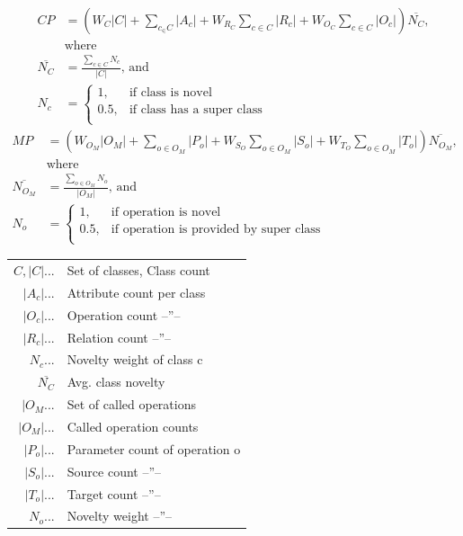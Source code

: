 \documentclass[conference]{IEEEtran}
\begin{document}
\small
\begin{align}
CP &= \left(W_C |C| + \sum_{c_ \in C} |A_c| + W_{R_C} \sum_{c \in C} |R_c| + W_{O_C} \sum_{c \in C} |O_c| \right) \overline{N_C},\\ &\text{where}\\
\overline{N_C} &= \frac{\sum_{c \in C} N_c}{|C|},\, \text{and}\\
N_c &=
\begin{cases}
1,& \text{if class is novel}\\
0.5,& \text{if class has a super class}\\
\end{cases}
\end{align}
\begin{align}
MP &= \left(W_{O_M} |O_M| + \sum_{o \in O_M} |P_o| + W_{S_O} \sum_{o \in O_M} |S_o| + W_{T_O} \sum_{o \in O_M} |T_o| \right) \overline{N_{O_M}},\\ &\text{where}\\
\overline{N_{O_M}} &= \frac{\sum_{o \in O_M} N_o}{|O_M|},\,\text{and}\\
N_o &=
\begin{cases}
1,& \text{if operation is novel}\\
0.5,& \text{if operation is provided by super class}\\
\end{cases}
\end{align}

\begin{tabularx}{\linewidth}{rX}
\hline
$C, |C|...$ & Set of classes, Class count \\
$|A_c|...$  & Attribute count per class   \\
$|O_c|...$  & Operation count --''--      \\
$|R_c|...$  & Relation count --''--       \\
$N_c...$    & Novelty weight of class c \\
$\overline{N_C}$ & Avg. class novelty \\
$|O_M...$  & Set of called operations \\
$|O_M|...$ & Called operation counts \\
$|P_o|...$ & Parameter count of operation o \\
$|S_o|...$ & Source count --''-- \\
$|T_o|...$ & Target count --''-- \\
$N_o...$   & Novelty weight --''-- \\
\end{tabularx}
\normalsize
\end{document}
